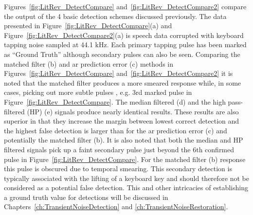 Figures~\ref{fig:LitRev_DetectCompare} and~\ref{fig:LitRev_DetectCompare2} compare the output of the 4 basic detection schemes discussed previously. The data presented in Figure~\ref{fig:LitRev_DetectCompare}(a) and Figure~\ref{fig:LitRev_DetectCompare2}(a) is speech data corrupted with keyboard tapping noise sampled at 44.1 kHz. Each primary tapping pulse has been marked as ``Ground Truth'' although secondary pulses can also be seen. Comparing the matched filter (b) and \gls{ar} prediction error (c) methods in Figures~\ref{fig:LitRev_DetectCompare} and~\ref{fig:LitRev_DetectCompare2} it is noted that the matched filter produces a more smeared response while, in some cases, picking out more subtle pulses \cite{Godsill1998book}, e.g. 3rd marked pulse in Figure~\ref{fig:LitRev_DetectCompare}. The median filtered (d) and the high pass-filtered (HP) (e) signals produce nearly identical results. These results are also superior in that they increase the margin between lowest correct detection and the highest false detection is larger than for the \gls{ar} prediction error (c) and potentially the matched filter (b). It is also noted that both the median and HP filtered signals pick up a faint secondary pulse just beyond the 6th confirmed pulse in Figure~\ref{fig:LitRev_DetectCompare}. For the matched filter (b) response this pulse is obscured due to temporal smearing. This secondary detection is typically associated with the lifting of a keyboard key and should therefore not be considered as a potential false detection. This and other intricacies of establishing a ground truth value for detections will be discussed in Chapters~\ref{ch:TransientNoiseDetection} and \ref{ch:TransientNoiseRestoration}.

